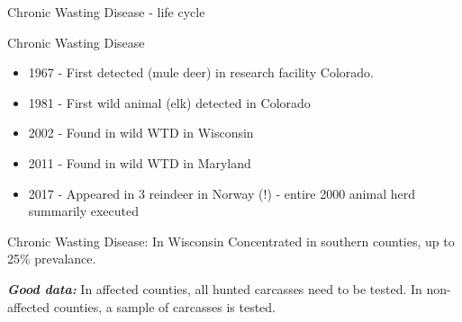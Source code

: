 \documentclass[
  11pt,
  ignorenonframetext,
  aspectratio=43]{beamer}
\providecommand{\tightlist}{%
  \setlength{\itemsep}{0pt}\setlength{\parskip}{0pt}}
\begin{document}
\begin{frame}{Chronic Wasting Disease - life cycle}
\protect\hypertarget{chronic-wasting-disease---life-cycle}{}
\end{frame}

\begin{frame}{Chronic Wasting Disease}
\protect\hypertarget{chronic-wasting-disease-2}{}
\bcol

\col[.4]

\footnotesize


\begin{itemize}
\tightlist
\item
  1967 - First detected (mule deer) in research facility Colorado.
\item
  1981 - First wild animal (elk) detected in Colorado
\item
  2002 - Found in wild WTD in Wisconsin
\item
  2011 - Found in wild WTD in Maryland
\item
  2017 - Appeared in 3 reindeer in Norway (!) - entire 2000 animal herd
  summarily executed
\end{itemize}

\ebb

\col[.6]


\ecol
\end{frame}

\begin{frame}{Chronic Wasting Disease: In Wisconsin}
\protect\hypertarget{chronic-wasting-disease-in-wisconsin}{}
Concentrated in southern counties, up to 25\% prevalance.

\bc {} \ec

\textbf{\emph{Good data:}} In affected counties, all hunted carcasses
need to be tested. In non-affected counties, a sample of carcasses is
tested.
\end{frame}
\end{document}
